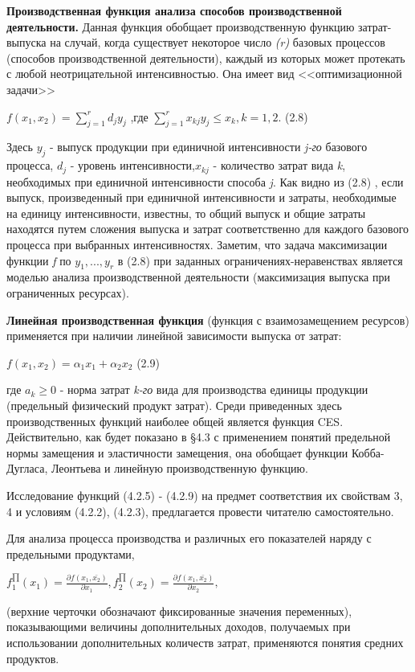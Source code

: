 \documentclass[12pt, 4paper]{book}
\begin{document}
{\textbf{Производственная функция анализа способов производственной деятельности.} Данная функция обобщает производственную функцию затрат-выпуска на случай, когда существует некоторое число \textit{(r)} базовых процессов (способов производственной деятельности), каждый из которых может протекать с любой неотрицательной интенсивностью. Она имеет вид <<оптимизационной задачи>>
\begin{center}
$f(x_1,x_2)= \sum_{j=1}^{r}d_j y_j$ ,где $\sum_{j=1}^{r}x_{kj} y_j \leq x_k , k=1,2$. (2.8)
\end{center}
\par

Здесь $y_j$ - выпуск продукции при единичной интенсивности \textit{j-го} базового процесса, $d_j$ - уровень интенсивности,$x_{kj}$  - количество затрат вида \textit{k}, необходимых при единичной интенсивности способа \textit{j}. Как видно из (2.8) , если выпуск, произведенный при единичной интенсивности и затраты, необходимые на единицу интенсивности, известны, то общий выпуск и общие затраты находятся путем сложения выпуска и затрат соответственно для каждого базового процесса при выбранных интенсивностях. Заметим, что задача максимизации функции \textit{f} по $y_1,...,y_r$ в (2.8) при заданных ограничениях-неравенствах является моделью анализа производственной деятельности (максимизация выпуска при ограниченных ресурсах). 
\par

\textbf{Линейная производственная функция }(функция с взаимозамещением ресурсов) применяется при наличии линейной зависимости выпуска от затрат: 
\begin{center}
$f(x_1,x_2)=\alpha_1 x_1 + \alpha_2 x_2$ (2.9)
\end{center}
где $a_k \geq 0$ - норма затрат \textit{k-го} вида для производства единицы продукции (предельный физический продукт затрат). Среди приведенных здесь производственных функций наиболее общей является функция CES. Действительно, как будет показано в §4.3 с применением понятий предельной нормы замещения и эластичности замещения, она обобщает функции Кобба-Дугласа, Леонтьева и линейную производственную функцию. 
\par

Исследование функций (4.2.5) - (4.2.9) на предмет соответствия их свойствам 3, 4 и условиям (4.2.2), (4.2.3), предлагается провести читателю самостоятельно. 
\par

Для анализа процесса производства и различных его показателей наряду с предельными продуктами, 
\begin{center}
$f_{1}^{\prod }(x_1) = \frac{\partial f(x_1,\bar{x_2})}{\partial x_1},f_{2}^{\prod }(x_2) = \frac{\partial f(x_1,\bar{x_2})}{\partial x_2},  $
\end{center}
(верхние черточки обозначают фиксированные значения переменных), показывающими величины дополнительных доходов, получаемых при использовании дополнительных количеств затрат, применяются понятия средних продуктов. 
\par

}
\end{document}
